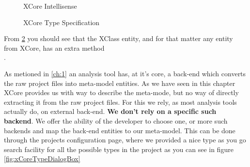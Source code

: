         \begin{figure}
        \centering
        \caption{XCore Intellisense \cite{oldThesis}}
        \label{fig:xCoreCommentView} 
        \end{figure}

        \begin{figure}[ht]
        \centering
        \caption{XCore Type Specification \cite{oldThesis}}
        \label{fig:xCorexRunExample}
        \end{figure}

        From \ref{fig:xCorexRunExample} you should see that the XClass entity, and for that matter any entity from XCore, has an extra method \\ .

        As metioned in \ref{ch:1} an analysis tool has, at it's core, a back-end which converts the raw project files into meta-model entities. As we have seen in this chapter XCore
provides us with way to describe the meta-mode, but no way of directly extracting it from the raw project files. For this we rely, as most analysis tools actually do, on external 
back-end. \textbf{We don't rely on a specific such backend}. We offer the ability of the developer to choose one, or more such backends and map the back-end entities to our meta-model.
This can be done through the projects configuration page, where we provided a nice type as you go search facility for all the possible types in the project as you can see in figure \ref{fig:xCoreTypeDialogBox}

